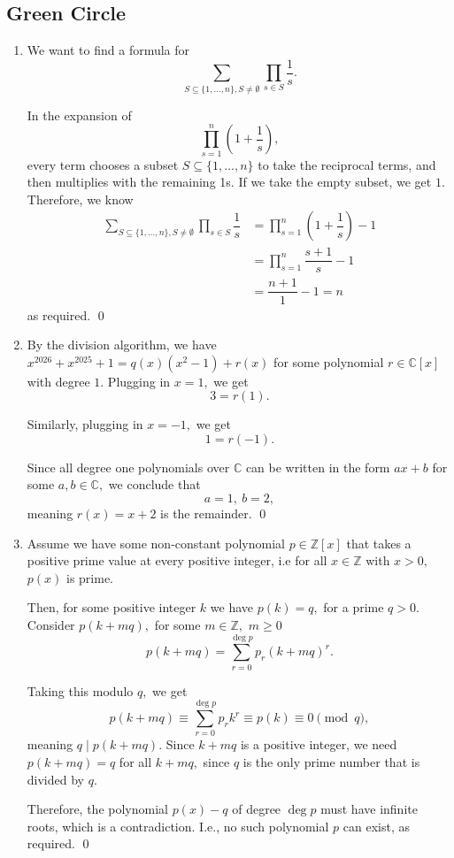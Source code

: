 \documentclass[12pt]{article}
\begin{document}
\subsection{Green Circle}
\begin{enumerate}
  \item[1] We want to find a formula for $$
    \sum_{S \subseteq \{1, \ldots, n\}, S \neq \emptyset} \prod_{s
    \in S} \dfrac{1}{s}.
    $$

    In the expansion of $$
    \prod_{s = 1}^{n}\left(1 + \dfrac{1}{s}\right),
    $$
    every term chooses a subset $S \subseteq \{1, \ldots, n\}$ to
    take the reciprocal terms, and then multiplies with the remaining
    1s. If we take the empty subset, we get $1.$ Therefore, we know
    \begin{align*}
      \sum_{S \subseteq \{1, \ldots, n\}, S \neq \emptyset} \prod_{s
      \in S} \dfrac{1}{s} &=
      \prod_{s = 1}^{n}\left(1 + \dfrac{1}{s}\right) - 1 \\
      &= \prod_{s = 1}^{n} \dfrac{s + 1}{s} - 1 \\
      &= \dfrac{n + 1}{1} -1 = n
    \end{align*}
    as required. \qed

  \item[4] By the division algorithm, we have $x^{2026} + x^{2025} +
    1 = q(x)(x^2 - 1) + r(x)$ for some polynomial $r \in \mathbb
    C[x]$ with degree $1.$ Plugging in $x = 1,$ we get $$
    3 = r(1).
    $$

    Similarly, plugging in $x = -1,$ we get $$
    1 = r(-1).
    $$

    Since all degree one polynomials over $\mathbb C$ can be written
    in the form $ax + b$ for some $a, b \in \mathbb C,$ we conclude that $$
    a = 1, \ b = 2,
    $$
    meaning $r(x) = x + 2$ is the remainder. \qed

  \item[5] Assume we have some non-constant polynomial $p \in
    \mathbb Z[x]$ that takes a positive prime value at every positive
    integer, i.e for all $x \in \mathbb Z$ with $x > 0,$ $p(x)$ is prime.

    Then, for some positive integer $k$ we have $p(k) = q,$ for a
    prime $q > 0.$ Consider $p(k + mq),$ for some $m \in \mathbb Z,$
    $m \geq 0$ $$
    p(k + mq ) = \sum_{r = 0 } ^{\deg p} p_r (k + mq)^{r}.
    $$

    Taking this modulo $q,$ we get
    $$
    p(k + mq ) \equiv \sum_{r = 0}^{\deg p} p_rk^r \equiv p(k) \equiv
    0  \pmod{q},
    $$
    meaning $q \mid p(k + mq).$ Since $k + mq $ is a positive
    integer, we need $p(k + mq ) = q$ for all $k + mq,$ since $q$ is
    the only prime number that is divided by $q.$

    Therefore, the polynomial $p(x) - q$ of degree $\deg p$ must have
    infinite roots, which is a contradiction. I.e., no such
    polynomial $p$ can exist, as required. \qed
\end{enumerate}
\end{document}
